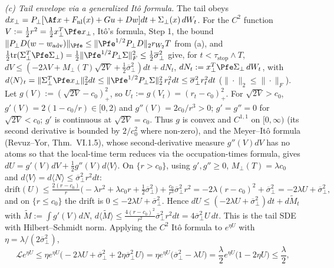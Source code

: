 \emph{(c) Tail envelope via a generalized It\^o formula.} The tail obeys \(dx_\perp = P_\perp[\Af x + F_{\mathrm{nl}}(x) + Gu + Dw]dt + \Sigma_\perp(x)\,dW_t\). For the \(C^2\) function \(V := \frac12 r^2 = \frac12x_\perp^T\Pfe x_\perp\), It\^o's formula, Step 1, the bound \(\|P_\perp D(w - w_{\mathrm{adv}})\|_{\Pfe} \le \|\Pfe^{1/2}P_\perp D\|_2r_{W_2}T\) from (a), and \(\frac12\mathrm{tr}(\Sigma_\perp^T\Pfe\Sigma_\perp) = \frac12\|\Pfe^{1/2}P_\perp\Sigma\|_F^2 \le \frac12\overline\sigma_\perp^2\) give, for \(t < \tau_{\mathrm{stop}} \wedge T\),
\(dV \le (-2\lambda V + M_\perp(T)\sqrt{2V} + \tfrac12\overline\sigma_\perp^2)dt + dN_t\), \(dN_t := x_\perp^T\Pfe\Sigma_\perp\,dW_t\), with \(d\langle N\rangle_t = \|\Sigma_\perp^T\Pfe x_\perp\|_2^2dt \le \|\Pfe^{1/2}P_\perp\Sigma\|_2^2\,r_t^2dt \le \overline\sigma_\perp^2r_t^2dt\) (\(\|\cdot\|_2 \le \|\cdot\|_F\)). Let \(g(V) := (\sqrt{2V} - c_0)_+^2\), so \(U_t := g(V_t) = (r_t - c_0)_+^2\). For \(\sqrt{2V} > c_0\), \(g'(V) = 2(1 - c_0/r) \in [0,2)\) and \(g''(V) = 2c_0/r^3 > 0\); \(g' = g'' = 0\) for \(\sqrt{2V} < c_0\); \(g'\) is continuous at \(\sqrt{2V} = c_0\). Thus \(g\) is convex and \(C^{1,1}\) on \([0,\infty)\) (its second derivative is bounded by \(2/c_0^2\) where non-zero), and the Meyer--It\^o formula (Revuz--Yor, Thm.~VI.1.5), whose second-derivative measure \(g''(V)dV\) has no atoms so that the local-time term reduces via the occupation-times formula, gives \(dU = g'(V)dV + \frac12g''(V)d\langle V\rangle\). On \(\{r > c_0\}\), using \(g', g'' \ge 0\), \(M_\perp(T) = \lambda c_0\) and \(d\langle V\rangle = d\langle N\rangle \le \overline\sigma_\perp^2r^2dt\):
\[
\text{drift}(U) \le \tfrac{2(r - c_0)}{r}\big(-\lambda r^2 + \lambda c_0 r + \tfrac12\overline\sigma_\perp^2\big) + \tfrac{c_0}{r^3}\overline\sigma_\perp^2r^2 = -2\lambda(r - c_0)^2 + \overline\sigma_\perp^2 = -2\lambda U + \overline\sigma_\perp^2,
\]
and on \(\{r \le c_0\}\) the drift is \(0 \le -2\lambda U + \overline\sigma_\perp^2\). Hence \(dU \le (-2\lambda U + \overline\sigma_\perp^2)dt + d\tilde M_t\) with \(\tilde M := \int g'(V)dN\), \(d\langle\tilde M\rangle \le \frac{4(r-c_0)^2}{r^2}\overline\sigma_\perp^2r^2dt = 4\overline\sigma_\perp^2U\,dt\). This is the tail SDE with Hilbert--Schmidt norm. Applying the \(C^2\) It\^o formula to \(e^{\eta U}\) with \(\eta = \lambda/(2\overline\sigma_\perp^2)\),
\[
\mathcal{L}e^{\eta U} \le \eta e^{\eta U}\big(-2\lambda U + \overline\sigma_\perp^2 + 2\eta\overline\sigma_\perp^2U\big) = \eta e^{\eta U}\big(\overline\sigma_\perp^2 - \lambda U\big) = \frac{\lambda}{2}e^{\eta U}\big(1 - 2\eta U\big) \le \frac{\lambda}{2},
\]
